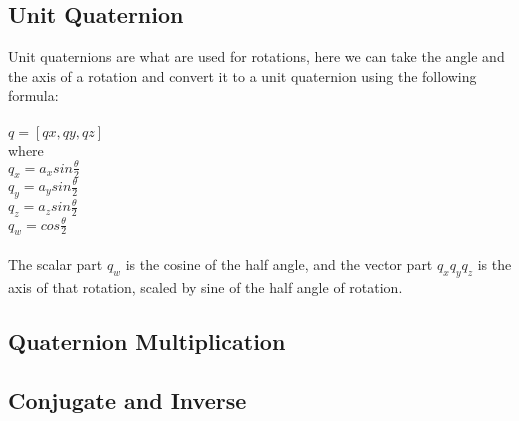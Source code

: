 \subsection{Unit Quaternion}
Unit quaternions are what are used for rotations, here we can take the angle and the axis of a rotation and convert it to a unit quaternion using the following formula: \\
\\
$q = [qx, qy, qz]$\\
where\\
$q_x = a_x sin \frac{\theta}{2}$\\
$q_y = a_y sin \frac{\theta}{2}$\\
$q_z = a_z sin \frac{\theta}{2}$\\
$q_w = cos \frac{\theta}{2}$\\
\\ 
The scalar part $q_w$ is the cosine of the half angle, and the vector part $q_x q_y q_z$ is the axis of that rotation, scaled by sine of the half angle of rotation.  

\subsection{Quaternion Multiplication}

\subsection{Conjugate and Inverse}